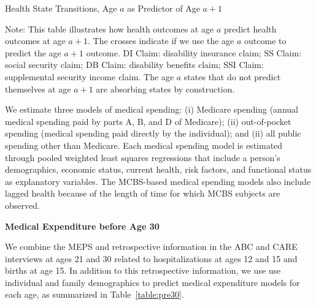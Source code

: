 \begin{table}
\begin{threeparttable}
\caption{Health State Transitions, Age $a$ as Predictor of Age $a+1$}\label{table:transition}
\scriptsize

\begin{tablenotes}
\footnotesize
\item Note: This table illustrates how health outcomes at age $a$ predict health outcomes at age $a+1$. The crosses indicate if we use the age $a$ outcome to predict the age $a+1$ outcome. DI Claim: disability insurance claim; SS Claim: social security claim; DB Claim: disability benefits claim; SSI Claim: supplemental security income claim. The age $a$ states that do not predict themselves at age $a+1$ are absorbing states by construction.
\end{tablenotes}
\end{threeparttable}
\end{table}

We estimate three models of medical spending: (i) Medicare spending (annual medical spending paid by parts A, B, and D of Medicare); (ii) out-of-pocket spending (medical spending paid directly by the individual); and (ii) all public spending other than Medicare. Each medical spending model is estimated through pooled weighted least squares regressions that include a person's demographics, economic status, current health, risk factors, and functional status as explanatory variables. The MCBS-based medical spending models also include lagged health because of the length of time for which MCBS subjects are observed.

\textbf{Medical Expenditure before Age 30}

We combine the MEPS and retrospective information in the ABC and CARE interviews at ages 21 and 30 related to hospitalizations at ages 12 and 15 and births at age 15. In addition to this retrospective information, we use use individual and family demographics to predict medical expenditure models for each age, as summarized in Table~\ref{table:pre30}.

